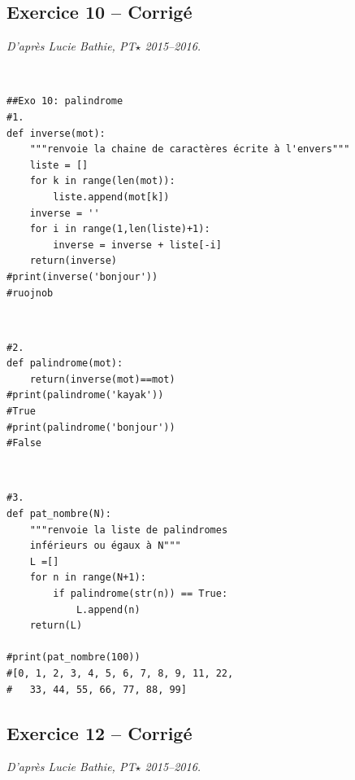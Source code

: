 \documentclass[10pt,fleqn]{article} %
\begin{document}
\begin{multicols}{2}
\subsection*{Exercice 10 -- Corrigé}
\textit{D'après Lucie Bathie, PT$\star$ 2015--2016.}


\begin{corrige}
$\quad$
\begin{lstlisting}
##Exo 10: palindrome
#1.
def inverse(mot):
    """renvoie la chaine de caractères écrite à l'envers"""
    liste = []
    for k in range(len(mot)):
        liste.append(mot[k])
    inverse = ''
    for i in range(1,len(liste)+1):
        inverse = inverse + liste[-i]
    return(inverse)
#print(inverse('bonjour'))
#ruojnob
\end{lstlisting}
\end{corrige}

\begin{corrige}
$\quad$
\begin{lstlisting}
#2.
def palindrome(mot):
    return(inverse(mot)==mot)
#print(palindrome('kayak'))
#True
#print(palindrome('bonjour'))
#False
\end{lstlisting}
\end{corrige}


\begin{corrige}
$\quad$
\begin{lstlisting}
#3.
def pat_nombre(N):
    """renvoie la liste de palindromes 
    inférieurs ou égaux à N"""
    L =[]
    for n in range(N+1):
        if palindrome(str(n)) == True:
            L.append(n)
    return(L)

#print(pat_nombre(100))
#[0, 1, 2, 3, 4, 5, 6, 7, 8, 9, 11, 22, 
#   33, 44, 55, 66, 77, 88, 99]
\end{lstlisting}
\end{corrige}


\end{multicols}


\subsection*{Exercice 12 -- Corrigé}
\textit{D'après Lucie Bathie, PT$\star$ 2015--2016.}
\end{document}
